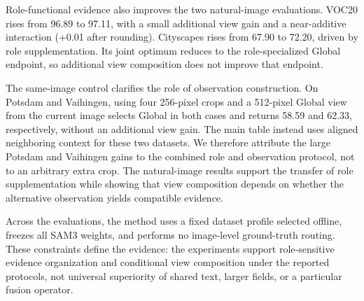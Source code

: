 Role-functional evidence also improves the two natural-image evaluations. VOC20 rises from 96.89 to 97.11, with a small additional view gain and a near-additive interaction (+0.01 after rounding). Cityscapes rises from 67.90 to 72.20, driven by role supplementation. Its joint optimum reduces to the role-specialized Global endpoint, so additional view composition does not improve that endpoint.

The same-image control clarifies the role of observation construction. On Potsdam and Vaihingen, using four 256-pixel crops and a 512-pixel Global view from the current image selects Global in both cases and returns 58.59 and 62.33, respectively, without an additional view gain. The main table instead uses aligned neighboring context for these two datasets. We therefore attribute the large Potsdam and Vaihingen gains to the combined role and observation protocol, not to an arbitrary extra crop. The natural-image results support the transfer of role supplementation while showing that view composition depends on whether the alternative observation yields compatible evidence.

Across the evaluations, the method uses a fixed dataset profile selected offline, freezes all SAM3 weights, and performs no image-level ground-truth routing. These constraints define the evidence: the experiments support role-sensitive evidence organization and conditional view composition under the reported protocols, not universal superiority of shared text, larger fields, or a particular fusion operator.

